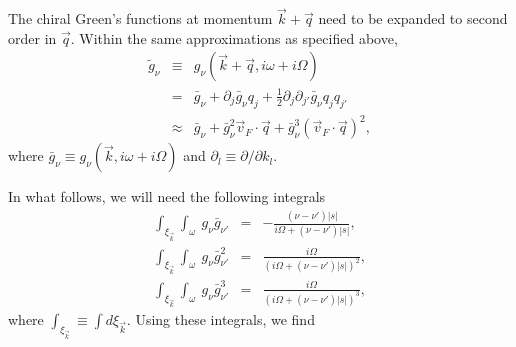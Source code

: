 \documentclass[prb,aps,twocolumn]{revtex4}
\newcommand{\bea}{\begin{eqnarray}}
\newcommand{\eea}{\end{eqnarray}}
\newcommand{\bk}{{\vec k}}
\newcommand{\bq}{{\vec q}}
\newcommand{\bv}{{\vec v}}
\newcommand{\nn}{\nonumber}
\begin{document}
The chiral Green's functions at momentum $\bk+\bq$ need to be
expanded to second order in $\bq$. Within the same approximations
as specified above, \bea\label{eq:gexp} \tilde g_\nu&\equiv&
g_\nu(\bk+\bq,i\omega+i\Omega) \nonumber\\
&=&\bar g_\nu+\partial_j\bar g_\nu q_j +
\frac12\partial_j\partial_{j'}\bar g_\nu q_jq_{j'}
\nonumber\\
&\approx&\bar g_\nu+\bar g_\nu^2\bv_{F}\cdot\bq +\bar
g_\nu^3(\bv_{F}\cdot\bq)^2,
\eea
where $\bar g_\nu\equiv
g_\nu(\bk,i\omega+i\Omega)$ and $\partial_l\equiv
\partial/\partial k_l$.

In what follows, we will need the following integrals
\bea\label{eq:need}
\int_{\xi_\bk} \int_\omega~g_{\nu}\bar g_{\nu'}&=&-\frac{(\nu-\nu')|s|}{i\Omega+(\nu-\nu')|s|},\nn\\
\int_{\xi_\bk} \int_\omega~g_{\nu}\bar g^2_{\nu'}&=&\frac{i\Omega}{(i\Omega+(\nu-\nu')|s|)^2},\nn\\
\int_{\xi_\bk} \int_\omega~g_{\nu}\bar
g^3_{\nu'}&=&\frac{i\Omega}{(i\Omega+(\nu-\nu')|s|)^3}, \eea where
$\int_{{\xi_\bk}}\equiv \int d\xi_{\bk}$. Using these integrals,
we find
\end{document}
